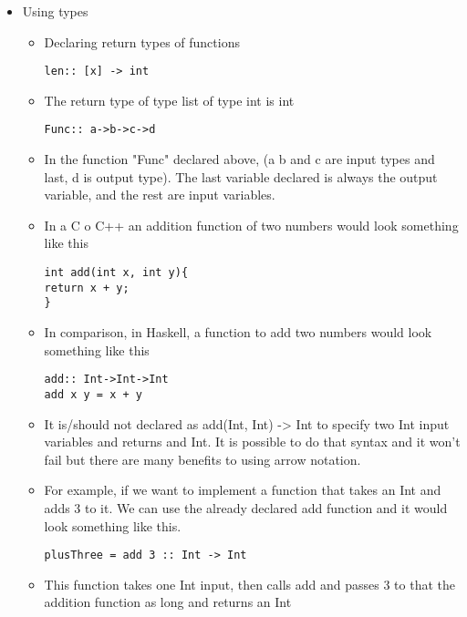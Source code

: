 \documentclass{article}
\begin{document}
\begin{itemize}
\begin{lstlisting}
\end{lstlisting}
  \item Using types
  \begin{itemize}
      \item Declaring return types of functions
      \begin{lstlisting}
len:: [x] -> int
\end{lstlisting}
      \item The return type of type list of type int is int
      \begin{lstlisting}
Func:: a->b->c->d
\end{lstlisting}
    \item In the function "Func" declared above, (a b and c are input types and last, d is output type). The last variable declared is always the output variable, and the rest are input variables.
    \item In a C o C++ an addition function of two numbers would look something like this
          \begin{lstlisting}
int add(int x, int y){
return x + y;
}
\end{lstlisting}
    \item In comparison, in Haskell, a function to add two numbers would look something like this
    \begin{lstlisting}
add:: Int->Int->Int
add x y = x + y
\end{lstlisting}
    \item It is/should not declared as add(Int, Int) -> Int to specify two Int input variables and returns and Int. It is possible to do that syntax and it won't fail but there are many benefits to using arrow notation.
    \item For example, if we want to implement a function that takes an Int and adds 3 to it. We can use the already declared add function and it would look something like this.

    \begin{lstlisting}
plusThree = add 3 :: Int -> Int
\end{lstlisting}
    \item This function takes one Int input, then calls add and passes 3 to that the addition function as long and returns an Int %



\end{itemize}
\end{itemize}
\end{document}
